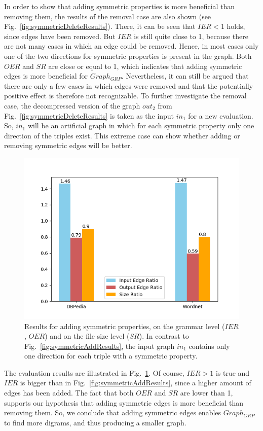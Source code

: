 In order to show that adding symmetric properties is more beneficial than removing them, the results of the removal case are also shown (see Fig.~\ref{fig:symmetricDeleteResults}). There, it can be seen that $IER<1$ holds, since edges have been removed. But $IER$ is still quite close to 1, because there are not many cases in which an edge could be removed. Hence, in most cases only one of the two directions for symmetric properties is present in the graph. Both $OER$ and $SR$ are close or equal to 1, which indicates that adding symmetric edges is more beneficial for $Graph_{GRP}$. Nevertheless, it can still be argued that there are only a few cases in which edges were removed and that the potentially positive effect is therefore not recognizable. To further investigate the removal case, the decompressed version of the graph $out_2$ from Fig.~\ref{fig:symmetricDeleteResults} is taken as the input $in_1$ for a new evaluation. So, $in_1$ will be an artificial graph in which for each symmetric property only one direction of the triples exist. This extreme case can show whether adding or removing symmetric edges will be better.



\clearpage

\begin{figure}
	\centering
	\includegraphics[width=0.6\linewidth]{figures/4_evaluation/ontology/ratiosSymmetricsAdd2}
	\caption{Results for adding symmetric properties, on the grammar level ($IER$, $OER$) and on the file size level ($SR$). In contrast to Fig.~\ref{fig:symmetricAddResults}, the input graph $in_1$ contains only one direction for each triple with a symmetric property.}
	\label{fig:symmetricAddResults2}
\end{figure}

The evaluation results are illustrated in Fig.~\ref{fig:symmetricAddResults2}. Of course, $IER>1$ is true and $IER$ is bigger than in Fig.~\ref{fig:symmetricAddResults}, since a higher amount of edges has been added. The fact that both $OER$ and $SR$ are lower than 1, supports our hypothesis that adding symmetric edges is more beneficial than removing them. So, we conclude that adding symmetric edges enables $Graph_{GRP}$ to find more digrams, and thus producing a smaller graph.


